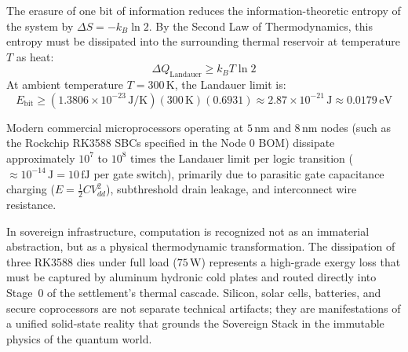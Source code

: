 The erasure of one bit of information reduces the information-theoretic entropy of the system by $\Delta S = -k_B \ln 2$. By the Second Law of Thermodynamics, this entropy must be dissipated into the surrounding thermal reservoir at temperature $T$ as heat:
\begin{equation}
\Delta Q_{\mathrm{Landauer}} \ge k_B T \ln 2
\label{eq:landauer_limit_qm}
\end{equation}
At ambient temperature $T = 300\,\mathrm{K}$, the Landauer limit is:
\begin{equation}
E_{\mathrm{bit}} \ge (1.3806 \times 10^{-23}\,\mathrm{J/K})(300\,\mathrm{K})(0.6931) \approx 2.87 \times 10^{-21}\,\mathrm{J} \approx 0.0179\,\mathrm{eV}
\label{eq:landauer_value}
\end{equation}

Modern commercial microprocessors operating at $5\,\mathrm{nm}$ and $8\,\mathrm{nm}$ nodes (such as the Rockchip RK3588 SBCs specified in the Node 0 BOM) dissipate approximately $10^7$ to $10^8$ times the Landauer limit per logic transition ($\approx 10^{-14}\,\mathrm{J} = 10\,\mathrm{fJ}$ per gate switch), primarily due to parasitic gate capacitance charging ($E = \frac{1}{2} C V_{dd}^2$), subthreshold drain leakage, and interconnect wire resistance. 

In sovereign infrastructure, computation is recognized not as an immaterial abstraction, but as a physical thermodynamic transformation. The dissipation of three RK3588 dies under full load ($75\,\mathrm{W}$) represents a high-grade exergy loss that must be captured by aluminum hydronic cold plates and routed directly into Stage~0 of the settlement's thermal cascade. Silicon, solar cells, batteries, and secure coprocessors are not separate technical artifacts; they are manifestations of a unified solid-state reality that grounds the Sovereign Stack in the immutable physics of the quantum world.
